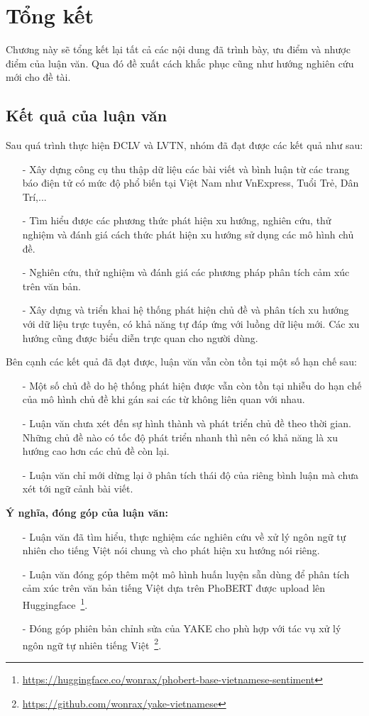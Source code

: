 \chapter{Tổng kết}

Chương này sẽ tổng kết lại tất cả các nội dung đã trình bày, ưu điểm và nhược điểm của luận văn. Qua đó đề xuất cách khắc phục cũng như hướng nghiên cứu mới cho đề tài.

\section{Kết quả của luận văn}

Sau quá trình thực hiện ĐCLV và LVTN, nhóm đã đạt được các kết quả như sau:
\begin{itemize}
    \item[-] Xây dựng công cụ thu thập dữ liệu các bài viết và bình luận từ các trang báo điện tử có mức độ phổ biến tại Việt Nam như VnExpress, Tuổi Trẻ, Dân Trí,...
    \item[-] Tìm hiểu được các phương thức phát hiện xu hướng, nghiên cứu, thử nghiệm và đánh giá cách thức phát hiện xu hướng sử dụng các mô hình chủ đề.
    \item[-] Nghiên cứu, thử nghiệm và đánh giá các phương pháp phân tích cảm xúc trên văn bản.
    \item[-] Xây dựng và triển khai hệ thống phát hiện chủ đề và phân tích xu hướng với dữ liệu trực tuyến, có khả năng tự đáp ứng với luồng dữ liệu mới. Các xu hướng cũng được biểu diễn trực quan cho người dùng.
\end{itemize}

\noindent Bên cạnh các kết quả đã đạt được, luận văn vẫn còn tồn tại một số hạn chế sau:
\begin{itemize}
    \item[-] Một số chủ đề do hệ thống phát hiện được vẫn còn tồn tại nhiễu do hạn chế của mô hình chủ đề khi gán sai các từ không liên quan với nhau.
    \item[-] Luận văn chưa xét đến sự hình thành và phát triển chủ đề theo thời gian. Những chủ đề nào có tốc độ phát triển nhanh thì nên có khả năng là xu hướng cao hơn các chủ đề còn lại.
    \item[-] Luận văn chỉ mới dừng lại ở phân tích thái độ của riêng bình luận mà chưa xét tới ngữ cảnh bài viết.
\end{itemize}

\noindent\textbf{Ý nghĩa, đóng góp của luận văn:}
\begin{itemize}
    \item[-] Luận văn đã tìm hiểu, thực nghiệm các nghiên cứu về xử lý ngôn ngữ tự nhiên cho tiếng Việt nói chung và cho phát hiện xu hướng nói riêng.
    \item[-] Luận văn đóng góp thêm một mô hình huấn luyện sẵn dùng để phân tích cảm xúc trên văn bản tiếng Việt dựa trên PhoBERT được upload lên Huggingface~\footnote{\url{https://huggingface.co/wonrax/phobert-base-vietnamese-sentiment}}.
    \item[-] Đóng góp phiên bản chỉnh sửa của YAKE cho phù hợp với tác vụ xử lý ngôn ngữ tự nhiên tiếng Việt~\footnote{\url{https://github.com/wonrax/yake-vietnamese}}.
\end{itemize}

